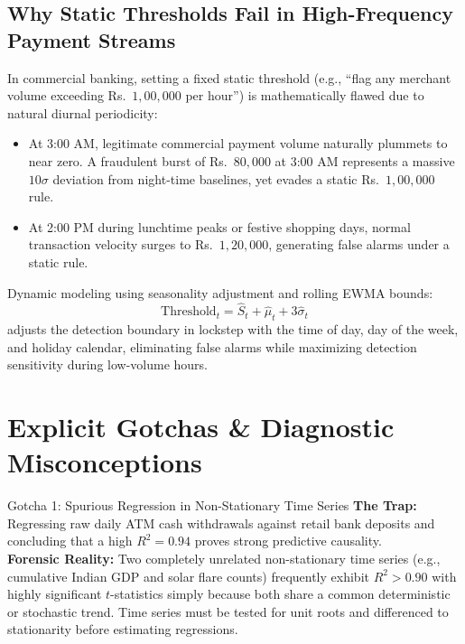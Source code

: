 \subsection{Why Static Thresholds Fail in High-Frequency Payment Streams}
In commercial banking, setting a fixed static threshold (e.g., ``flag any merchant volume exceeding Rs.~$1{,}00{,}000$ per hour'') is mathematically flawed due to natural diurnal periodicity:
\begin{itemize}
    \item At 3:00 AM, legitimate commercial payment volume naturally plummets to near zero. A fraudulent burst of Rs.~$80{,}000$ at 3:00 AM represents a massive $10\sigma$ deviation from night-time baselines, yet evades a static Rs.~$1{,}00{,}000$ rule.
    \item At 2:00 PM during lunchtime peaks or festive shopping days, normal transaction velocity surges to Rs.~$1{,}20{,}000$, generating false alarms under a static rule.
\end{itemize}
Dynamic modeling using seasonality adjustment and rolling EWMA bounds:
\begin{equation}
\text{Threshold}_t = \hat{S}_t + \hat{\mu}_t + 3 \hat{\sigma}_t
\end{equation}
adjusts the detection boundary in lockstep with the time of day, day of the week, and holiday calendar, eliminating false alarms while maximizing detection sensitivity during low-volume hours.

\section{Explicit Gotchas \& Diagnostic Misconceptions}

\begin{trapbox}{Gotcha 1: Spurious Regression in Non-Stationary Time Series}
\textbf{The Trap:} Regressing raw daily ATM cash withdrawals against retail bank deposits and concluding that a high $R^2 = 0.94$ proves strong predictive causality.\\
\textbf{Forensic Reality:} Two completely unrelated non-stationary time series (e.g., cumulative Indian GDP and solar flare counts) frequently exhibit $R^2 > 0.90$ with highly significant $t$-statistics simply because both share a common deterministic or stochastic trend. Time series must be tested for unit roots and differenced to stationarity before estimating regressions.
\end{trapbox}

